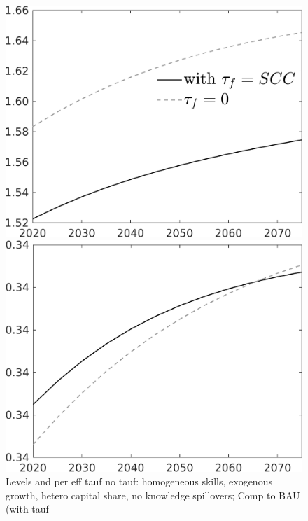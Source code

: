 \documentclass[12pt]{article}
\begin{document}
\begin{figure}[h!!]
	\centering
	\caption{Levels and per eff tauf no tauf: homogeneous skills, exogenous growth, hetero capital share, no knowledge spillovers; Comp to BAU (with tauf}\label{fig:Leveltauf_nsk1_xgr1_noknow_withtaul2}
	\begin{minipage}[]{0.32\textwidth}
		\includegraphics[width=1\textwidth]{../../codding_model/own_basedOnFried/optimalPol_010922_revision/figures/all_13Sept22/LevTaufNoTauf_TaulCalib_regime0_pn_spillover0_nsk1_xgr1_knspil1_sep1_LFlimit0_emsbase0_countec0_GovRev0_etaa0.79_lgd1.png}
	\end{minipage}	
	\begin{minipage}[]{0.32\textwidth}
		\includegraphics[width=1\textwidth]{../../codding_model/own_basedOnFried/optimalPol_010922_revision/figures/all_13Sept22/LevTaufNoTauf_TaulCalib_regime0_Ln_spillover0_nsk1_xgr1_knspil1_sep1_LFlimit0_emsbase0_countec0_GovRev0_etaa0.79_lgd0.png}

\end{minipage}
\end{figure}
\end{document}
